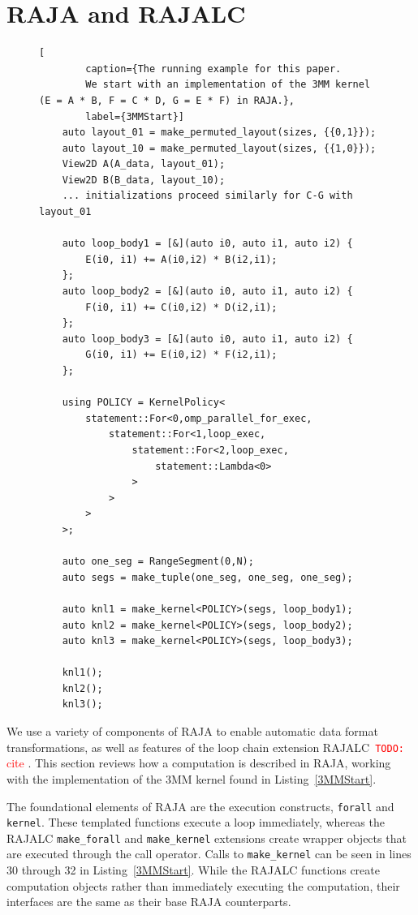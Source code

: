 \documentclass[sigconf, table]{acmart}
\newcommand{\todo}[1]{{\textcolor{red}{{\tt{TODO:}}\,\,#1 }}}
\begin{document}
\section{RAJA and RAJALC}

\begin{figure}
	\begin{lstlisting}[
		caption={The running example for this paper. 
		We start with an implementation of the 3MM kernel (E = A * B, F = C * D, G = E * F) in RAJA.},
		label={3MMStart}]
	auto layout_01 = make_permuted_layout(sizes, {{0,1}});
	auto layout_10 = make_permuted_layout(sizes, {{1,0}});
	View2D A(A_data, layout_01);
	View2D B(B_data, layout_10);
	... initializations proceed similarly for C-G with layout_01

	auto loop_body1 = [&](auto i0, auto i1, auto i2) {
		E(i0, i1) += A(i0,i2) * B(i2,i1);
	};
	auto loop_body2 = [&](auto i0, auto i1, auto i2) {
		F(i0, i1) += C(i0,i2) * D(i2,i1);
	};
	auto loop_body3 = [&](auto i0, auto i1, auto i2) {
		G(i0, i1) += E(i0,i2) * F(i2,i1);
	};
	
	using POLICY = KernelPolicy<
		statement::For<0,omp_parallel_for_exec,
			statement::For<1,loop_exec,
				statement::For<2,loop_exec,
					statement::Lambda<0>
				>
			>
		>
	>;

	auto one_seg = RangeSegment(0,N);
	auto segs = make_tuple(one_seg, one_seg, one_seg);

	auto knl1 = make_kernel<POLICY>(segs, loop_body1);
	auto knl2 = make_kernel<POLICY>(segs, loop_body2);
	auto knl3 = make_kernel<POLICY>(segs, loop_body3);

	knl1();
	knl2();
	knl3();
	\end{lstlisting}
\end{figure}


We use a variety of components of RAJA to enable automatic data format transformations, as well as features of the loop chain extension RAJALC~\todo{cite}. 
This section reviews how a computation is described in RAJA, working with the implementation of the 3MM kernel found in Listing~\ref{3MMStart}.

The foundational elements of RAJA are the execution constructs, \verb.forall. and \verb.kernel.. 
These templated functions execute a loop immediately, whereas the RAJALC \verb.make_forall. and \verb.make_kernel. extensions create wrapper objects that are executed through the call operator. 
Calls to \verb.make_kernel. can be seen in lines 30 through 32 in Listing~\ref{3MMStart}. 
While the RAJALC functions create computation objects rather than immediately executing the computation, their interfaces are the same as their base RAJA counterparts.
\end{document}
